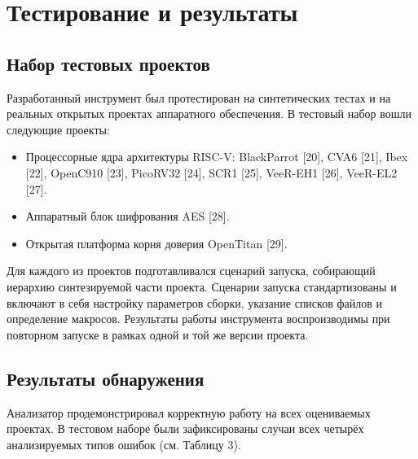 \section{Тестирование и результаты}

\subsection{Набор тестовых проектов}

Разработанный инструмент был протестирован на синтетических тестах и на реальных открытых проектах
аппаратного обеспечения. В тестовый набор вошли следующие проекты:

\begin{itemize}
\item Процессорные ядра архитектуры RISC-V: BlackParrot [20], CVA6 [21], Ibex [22], OpenC910 [23],
PicoRV32 [24], SCR1 [25], VeeR-EH1 [26], VeeR-EL2 [27].

\item Аппаратный блок шифрования AES [28].

\item Открытая платформа корня доверия OpenTitan [29].
\end{itemize}

Для каждого из проектов подготавливался сценарий запуска, собирающий иерархию синтезируемой части
проекта. Сценарии запуска стандартизованы и включают в себя настройку параметров сборки, указание
списков файлов и определение макросов. Результаты работы инструмента воспроизводимы при повторном
запуске в рамках одной и той же версии проекта.

\subsection{Результаты обнаружения}

Анализатор продемонстрировал корректную работу на всех оцениваемых проектах. В тестовом наборе
были зафиксированы случаи всех четырёх анализируемых типов ошибок (см. Таблицу 3).

